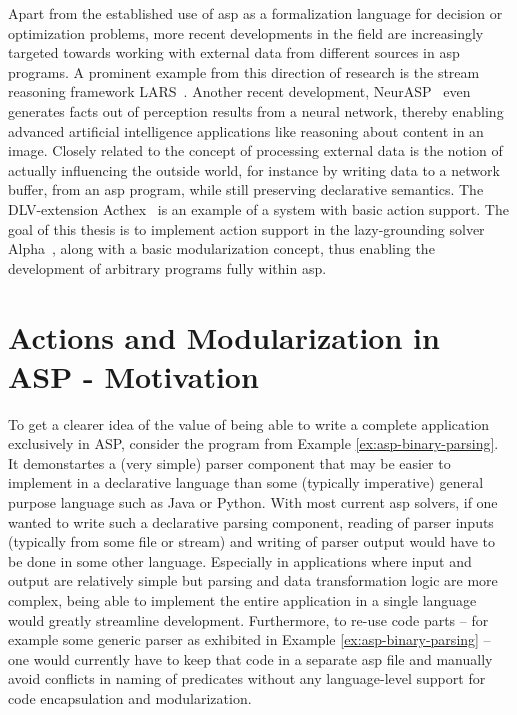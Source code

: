 Apart from the established use of \gls{asp} as a formalization language for decision  or optimization problems, more recent developments in the field are increasingly targeted towards working with external data from different sources in \gls{asp} programs. A prominent example from this direction of research is the stream reasoning framework LARS~\cite{lars}. Another recent development, NeurASP~\cite{neurasp} even generates facts out of perception results from a neural network, thereby enabling advanced artificial intelligence applications like reasoning about content in an image. Closely related to the concept of processing external data is the notion of actually influencing the outside world, for instance by writing data to a network buffer, from an \gls{asp} program, while still preserving declarative semantics. The DLV-extension Acthex~\cite{acthex} is an example of a system with basic action support. The goal of this thesis is to implement action support in the lazy-grounding solver Alpha~\cite{alpha}, along with a basic modularization concept, thus enabling the development of arbitrary programs fully within \gls{asp}.

\section{Actions and Modularization in ASP - Motivation}

To get a clearer idea of the value of being able to write a complete application exclusively in ASP, consider the program from Example \ref{ex:asp-binary-parsing}. It demonstartes a (very simple) parser component that may be easier to implement in a declarative language than some (typically imperative) general purpose language such as Java or Python. With most current \gls{asp} solvers, if one wanted to write such a declarative parsing component, reading of parser inputs (typically from some file or stream) and writing of parser output would have to be done in some other language. Especially in applications where input and output are relatively simple but parsing and data transformation logic are more complex, being able to implement the entire application in a single language would greatly streamline development.
Furthermore, to re-use code parts -- for example some generic parser as exhibited in Example \ref{ex:asp-binary-parsing} -- one would currently have to keep that code in a separate \gls{asp} file and manually avoid conflicts in naming of predicates without any language-level support for code encapsulation and modularization. 

